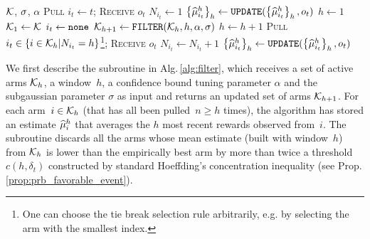  \begin{minipage}{\textwidth}
\renewcommand*\footnoterule{}
\begin{savenotes}
\begin{algorithm}[H]
\caption{\FEWA}
\label{alg:FEWA}
\begin{algorithmic}[1]
\Require $\mathcal{K}$,  $\sigma$, $\alpha$
	\State \textsc{Pull}  $i_t \gets t$; \textsc{Receive} $o_{t}$
	\State $N_{i_t} \gets 1$
	\State $\left\{\widehat{\mu}_{i_t}^h\right\}_h \gets \normalfont \texttt{UPDATE}(\left\{\widehat{\mu}_{i_t}^h\right\}_h, o_t)$\label{algline:fewa-update1}
\EndFor
{}
	\State $h\leftarrow 1$ 
	{\footnotesize {}}
	\State $\mathcal{K}_1 \leftarrow \mathcal{K}$ 
	{\footnotesize {}}
	\State $i_t \gets {\tt none}$
		\State $\mathcal{K}_{h+1} \leftarrow {\normalfont \texttt{FILTER}}(\mathcal{K}_{h} ,h, \alpha, \sigma)$ \label{algline:fewa-filter}
		\State $h \leftarrow h + 1$ \label{algline:fewa-window}
			\label{algline:fewa-condition}
			\State \textsc{Pull}  $i_t \in \left\{ i \in \mathcal{K}_h | N_{i_t} = h \right\}$\footnote{One can choose the tie break selection rule arbitrarily, e.g. by selecting the arm with the smallest index.}; \textsc{Receive} $o_{t}$\label{algline:fewa-pull}
		\EndIf
	\EndWhile
    \State $N_{i_t} \leftarrow N_{i_t} +1$
	\State $\left\{\widehat{\mu}_{i_t}^h\right\}_h \gets \normalfont \texttt{UPDATE}(\left\{\widehat{\mu}_{i_t}^h\right\}_h, o_t)$\label{algline:fewa-update2}
\EndFor
\end{algorithmic}
\end{algorithm}
\end{savenotes}
\end{minipage}

We first describe the subroutine {\FILTER} in Alg.\,\ref{alg:filter}, which receives a set of active arms $\mathcal{K}_h$, a window~$h$, a confidence bound tuning parameter $\alpha$ and the subgaussian parameter $\sigma$  as input and returns an updated set of arms $\mathcal{K}_{h+1}$. For each arm~$i \in \mathcal{K}_h$ (that has all been pulled~$n \geq h$ times), the algorithm has stored an estimate $\widehat{\mu}_i^h$ that averages the $h$ most recent rewards observed from~$i$. 
The subroutine \FILTER discards all the arms whose mean estimate (built with window~$h$) from $\mathcal{K}_h$  is lower than the empirically best arm by more than twice a threshold $c(h, \delta_t)$ constructed by standard Hoeffding's concentration inequality (see Prop.\,\ref{prop:prb_favorable_event}). %



